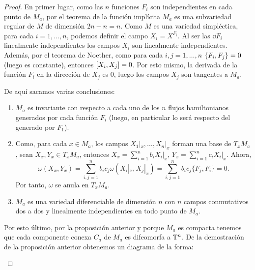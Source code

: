 \begin{proof}
  En primer lugar, como las $n$ funciones $F_i$ son independientes en cada punto de $M_a$, por el teorema de la función implícita $M_a$ es una subvariedad regular de $M$ de dimensión $2n-n=n$. 
  Como $M$ es una variedad simpléctica, para cada $i=1,\dots,n$, podemos definir el campo $X_i=X^{F_i}$. Al ser las $\dd F_i$ linealmente independientes los campos $X_i$ son linealmente independientes. Además, por el teorema de Noether, como para cada $i,j= 1,\dots,n$ $\left\lbrace F_i,F_j\right\rbrace=0$ (luego es constante), entonces $\left[X_i,X_j\right]=0$. Por esto mismo, la derivada de la función $F_i$ en la dirección de $X_j$ es 0, luego los campos $X_j$ son tangentes a $M_a$.

  De aquí sacamos varias conclusiones:
  \begin{enumerate}
    \item $M_a$ es invariante con respecto a cada uno de los $n$ flujos hamiltonianos generados por cada función $F_i$ (luego, en particular lo será respecto del generado por $F_1$).
    \item Como, para cada $x \in M_a$, los campos $X_1|_x,\dots, X_n|_x$ forman una base de $T_x M_a$, sean $X_x, Y_x \in T_x M_a$, entonces $X_x = \sum_{i=1}^n b_i X_i|_x$, $Y_x=\sum_{i=1}^n c_i X_i|_x$. Ahora,
      \[
	\omega(X_x,Y_x)= \sum_{i,j=1}^n b_i c_j \omega(X_i|_x,X_j|_x) = \sum_{i,j=1}^n b_i c_j \{F_j,F_i\} = 0.
      \]
      Por tanto, $\omega$ se anula en $T_x M_a$. 
    \item $M_a$ es una variedad diferenciable de dimensión $n$ con $n$ campos conmutativos dos a dos y linealmente independientes en todo punto de $M_a$. 
  \end{enumerate}

Por esto último, por la proposición anterior y porque $M_a$ es compacta tenemos que cada componente conexa $C_a$ de $M_a$ es difeomorfa a $\mathbb{T}^n$. De la demostración de la proposición anterior obtenemos un diagrama de la forma:

\begin{center}
\end{center}



\end{proof}
